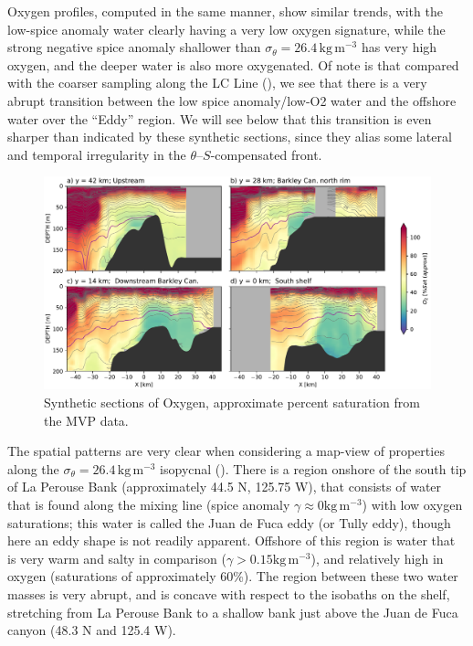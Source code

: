 \documentclass[draft]{agujournal2019}
\begin{document}
Oxygen profiles, computed in the same manner, show similar trends, with the low-spice anomaly water clearly having a very low oxygen signature, while the strong negative spice anomaly shallower than $\sigma_{\theta} = 26.4\,\mathrm{kg\,m^{-3}}$ has very high oxygen, and the deeper water is also more oxygenated.  Of note is that compared with the coarser sampling along the LC Line (), we see that there is a very abrupt transition between the low spice anomaly/low-O2 water and the offshore water over the ``Eddy'' region.  We will see below that this transition is even sharper than indicated by these synthetic sections, since they alias some lateral and temporal irregularity in the $\theta$--$S$-compensated front.

\begin{figure}[htbp]
  \begin{center}
    \includegraphics[width=6.2in]{CrossSectionsO2}
    \caption{Synthetic sections of Oxygen, approximate percent saturation from the MVP data.
      \label{fig:CrossSectionsO2} }
  \end{center}
\end{figure}

The spatial patterns are very clear when considering a map-view of properties along the $\sigma_{\theta} = 26.4\,\mathrm{kg\,m^{-3}}$ isopycnal ().  There is a region onshore of the south tip of La Perouse Bank (approximately 44.5 N, 125.75 W), that consists of water that is found along the mixing line (spice anomaly $\gamma \approx 0 \mathrm{kg\,m^{-3}}$) with low oxygen saturations; this water is called the Juan de Fuca eddy (or Tully eddy), though here an eddy shape is not readily apparent.  Offshore of this region is water that is very warm and salty in comparison ($\gamma > 0.15 \mathrm{kg\,m^{-3}}$), and relatively high in oxygen (saturations of approximately 60\%).  The region between these two water masses is very abrupt, and is concave with respect to the isobaths on the shelf,  stretching from La Perouse Bank to a shallow bank just above the Juan de Fuca canyon (48.3 N and 125.4 W).
\end{document}
